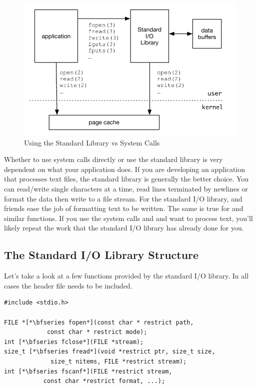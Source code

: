 \begin{figure}
	\includegraphics[scale=0.6]{figures/stdio-1.pdf}
	\centering
	\caption{Using the Standard Library vs System Calls}
	\label{fig:stdio-1}
\end{figure}

Whether to use system calls directly or use the standard library is very dependent on what your application does. If you are developing an application that processes text files, the standard library is generally the better choice. You can read/write single characters at a time, read lines terminated by newlines or format the data then write to a file stream. For the standard I/O library,  and friends ease the job of formatting text to be written. The same is true for  and similar functions. If you use the system calls  and  and want to process text, you'll likely repeat the work that the standard I/O library has already done for you.


\subsection{The Standard I/O Library  Structure}

Let's take a look at a few functions provided by the standard I/O library. In all cases the  header file needs to be included.

\begin{lstlisting}
#include <stdio.h>

FILE *[*\bfseries fopen*](const char * restrict path,
            const char * restrict mode);
int [*\bfseries fclose*](FILE *stream);
size_t [*\bfseries fread*](void *restrict ptr, size_t size,
             size_t nitems, FILE *restrict stream);
int [*\bfseries fscanf*](FILE *restrict stream, 
           const char *restrict format, ...);
\end{lstlisting}

